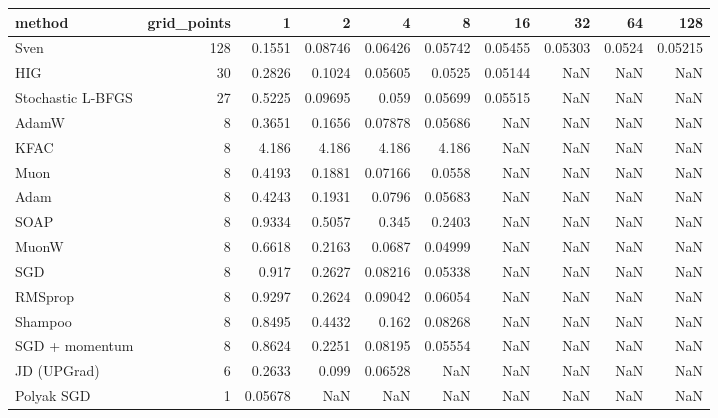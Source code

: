 \begin{tabular}{lrrrrrrrrr}
\toprule
method & grid\_points & 1 & 2 & 4 & 8 & 16 & 32 & 64 & 128 \\
\midrule
Sven & 128 & 0.1551 & 0.08746 & 0.06426 & 0.05742 & 0.05455 & 0.05303 & 0.0524 & 0.05215 \\
HIG & 30 & 0.2826 & 0.1024 & 0.05605 & 0.0525 & 0.05144 & NaN & NaN & NaN \\
Stochastic L-BFGS & 27 & 0.5225 & 0.09695 & 0.059 & 0.05699 & 0.05515 & NaN & NaN & NaN \\
AdamW & 8 & 0.3651 & 0.1656 & 0.07878 & 0.05686 & NaN & NaN & NaN & NaN \\
KFAC & 8 & 4.186 & 4.186 & 4.186 & 4.186 & NaN & NaN & NaN & NaN \\
Muon & 8 & 0.4193 & 0.1881 & 0.07166 & 0.0558 & NaN & NaN & NaN & NaN \\
Adam & 8 & 0.4243 & 0.1931 & 0.0796 & 0.05683 & NaN & NaN & NaN & NaN \\
SOAP & 8 & 0.9334 & 0.5057 & 0.345 & 0.2403 & NaN & NaN & NaN & NaN \\
MuonW & 8 & 0.6618 & 0.2163 & 0.0687 & 0.04999 & NaN & NaN & NaN & NaN \\
SGD & 8 & 0.917 & 0.2627 & 0.08216 & 0.05338 & NaN & NaN & NaN & NaN \\
RMSprop & 8 & 0.9297 & 0.2624 & 0.09042 & 0.06054 & NaN & NaN & NaN & NaN \\
Shampoo & 8 & 0.8495 & 0.4432 & 0.162 & 0.08268 & NaN & NaN & NaN & NaN \\
SGD + momentum & 8 & 0.8624 & 0.2251 & 0.08195 & 0.05554 & NaN & NaN & NaN & NaN \\
JD (UPGrad) & 6 & 0.2633 & 0.099 & 0.06528 & NaN & NaN & NaN & NaN & NaN \\
Polyak SGD & 1 & 0.05678 & NaN & NaN & NaN & NaN & NaN & NaN & NaN \\
\bottomrule
\end{tabular}
